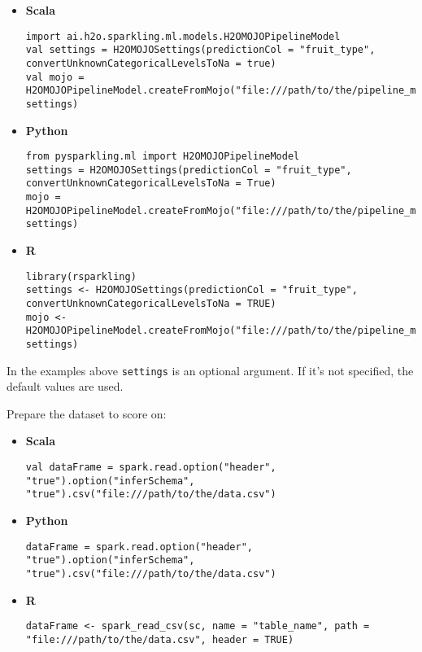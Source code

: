 \begin{itemize}
    \item \textbf{Scala} \begin{lstlisting}[style=Scala]
import ai.h2o.sparkling.ml.models.H2OMOJOPipelineModel
val settings = H2OMOJOSettings(predictionCol = "fruit_type", convertUnknownCategoricalLevelsToNa = true)
val mojo = H2OMOJOPipelineModel.createFromMojo("file:///path/to/the/pipeline_mojo.zip", settings)
    \end{lstlisting}
    \item \textbf{Python} \begin{lstlisting}[style=Python]
from pysparkling.ml import H2OMOJOPipelineModel
settings = H2OMOJOSettings(predictionCol = "fruit_type", convertUnknownCategoricalLevelsToNa = True)
mojo = H2OMOJOPipelineModel.createFromMojo("file:///path/to/the/pipeline_mojo.zip", settings)
    \end{lstlisting}
    \item \textbf{R} \begin{lstlisting}[style=R]
library(rsparkling)
settings <- H2OMOJOSettings(predictionCol = "fruit_type", convertUnknownCategoricalLevelsToNa = TRUE)
mojo <- H2OMOJOPipelineModel.createFromMojo("file:///path/to/the/pipeline_mojo.zip", settings)
    \end{lstlisting}
\end{itemize}

In the examples above \texttt{settings} is an optional argument. If it's not specified, the default values are used.

Prepare the dataset to score on:

\begin{itemize}
    \item \textbf{Scala} \begin{lstlisting}[style=Scala]
val dataFrame = spark.read.option("header", "true").option("inferSchema", "true").csv("file:///path/to/the/data.csv")
    \end{lstlisting}
    \item \textbf{Python} \begin{lstlisting}[style=Python]
dataFrame = spark.read.option("header", "true").option("inferSchema", "true").csv("file:///path/to/the/data.csv")
    \end{lstlisting}
    \item \textbf{R} \begin{lstlisting}[style=R]
dataFrame <- spark_read_csv(sc, name = "table_name", path = "file:///path/to/the/data.csv", header = TRUE)
    \end{lstlisting}
\end{itemize}

